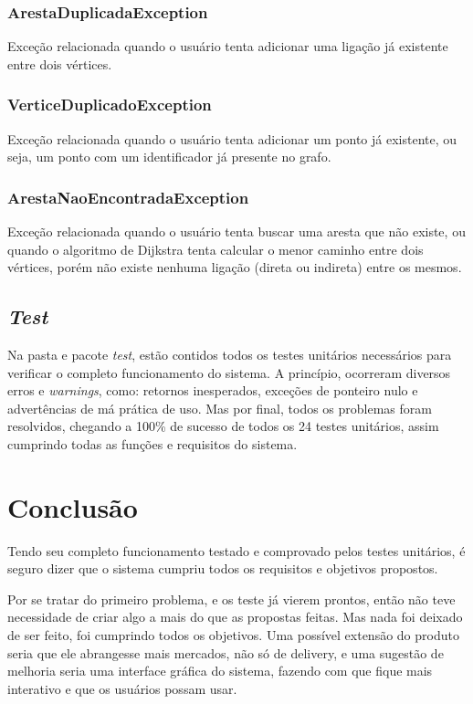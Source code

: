\documentclass[12pt]{article}
\begin{document}
\subsubsection{ArestaDuplicadaException}
Exceção relacionada quando o usuário tenta adicionar uma ligação já existente entre dois vértices.

\subsubsection{VerticeDuplicadoException}
Exceção relacionada quando o usuário tenta adicionar um ponto já existente, ou seja, um ponto com um identificador já presente no grafo.

\subsubsection{ArestaNaoEncontradaException}
Exceção relacionada quando o usuário tenta buscar uma aresta que não existe, ou quando o algoritmo de Dijkstra tenta calcular o menor caminho entre dois vértices, porém não existe nenhuma ligação (direta ou indireta) entre os mesmos.

\subsection{{\itshape Test}}
Na pasta e pacote {\itshape test}, estão contidos todos os testes unitários necessários para verificar o completo funcionamento do sistema. A princípio, ocorreram diversos erros e {\itshape warnings}, como: retornos inesperados, exceções de ponteiro nulo e advertências de má prática de uso. Mas por final, todos os problemas foram resolvidos, chegando a 100\% de sucesso de todos os 24 testes unitários, assim cumprindo todas as funções e requisitos do sistema.

\section{Conclusão}
Tendo seu completo funcionamento testado e comprovado pelos testes unitários, é seguro dizer que o sistema cumpriu todos os requisitos e objetivos propostos.

Por se tratar do primeiro problema, e os teste já vierem prontos, então não teve necessidade de criar algo a mais do que as propostas feitas. Mas nada foi deixado de ser feito, foi cumprindo todos os objetivos. Uma possível extensão do produto seria que ele abrangesse mais mercados, não só de delivery, e uma sugestão de melhoria seria uma interface gráfica do sistema, fazendo com que fique mais interativo e que os usuários possam usar.


\end{document}
